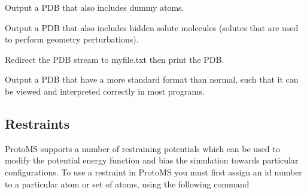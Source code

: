 \documentclass[letterpaper,10pt,english]{sphinxmanual}
\begin{document}
Output a PDB that also includes dummy atoms.

%
\begin{sphinxVerbatim}[commandchars=\\\{\}]
   
\end{sphinxVerbatim}

Output a PDB that also includes hidden solute molecules (solutes that are used to perform geometry perturbations).

%
\begin{sphinxVerbatim}[commandchars=\\\{\}]
   
\end{sphinxVerbatim}

Redirect the PDB stream to myfile.txt then print the PDB.

%
\begin{sphinxVerbatim}[commandchars=\\\{\}]
    
\end{sphinxVerbatim}

Output a PDB that have a more standard format than normal, such that it can be viewed and interpreted correctly in most programs.

\ignorespaces 

\subsection{Restraints}
\label{\detokenize{protoms:restraints}}\label{\detokenize{protoms:index-76}}
ProtoMS supports a number of restraining potentials which can be used to modify the potential energy function and bias the simulation towards particular configurations. To use a restraint in ProtoMS you must first assign an id number to a particular atom or set of atoms, using the following command

%
\begin{sphinxVerbatim}[commandchars=\\\{\}]
       
\end{sphinxVerbatim}
\end{document}
